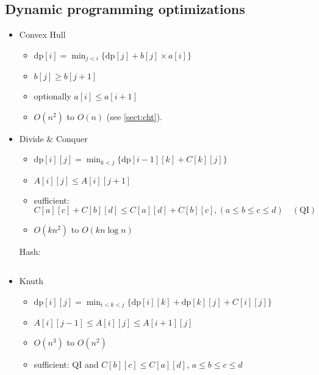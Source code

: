 \documentclass[9pt,a4paper,landscape,oneside]{amsart}
\newcommand{\mintedstyle}[2]{\inputminted{#1}{code/#2}}
\newcommand{\code}[1]{ Hash: 
\mintedstyle{cpp}{#1}}
\newenvironment{myitemize}
{\begin{itemize}[leftmargin=.3cm]
	\setlength{\itemsep}{0pt}
	\setlength{\parskip}{0pt}
	\setlength{\parsep}{0pt}     }
{ \end{itemize}                  }
\begin{document}
\begin{multicols*}{3}
\subsection{Dynamic programming optimizations}
\begin{myitemize}
	\item Convex Hull
		\begin{myitemize}
			\item $\mathrm{dp}[i] = \min_{j<i}\{\mathrm{dp}[j] + b[j] \times a[i]\}$
			\item $b[j] \geq b[j+1]$
			\item optionally $a[i] \leq a[i+1]$
			\item $O(n^2)$ to $O(n)$ (see \ref{sect:cht}).
		\end{myitemize}
	\item Divide \& Conquer
		\begin{myitemize}
			\item $\mathrm{dp}[i][j] = \min_{k<j}\{\mathrm{dp}[i-1][k] + C[k][j]\}$
			\item $A[i][j] \leq A[i][j+1]$
			\item sufficient:
				\[ C[a][c] + C[b][d] \leq C[a][d] + C[b][c], (a\leq b\leq c\leq d) \quad (\text{QI}) \]
			\item $O(kn^2)$ to $O(kn\log{n})$
		\end{myitemize}
		\code{divco.cpp}
	\item Knuth
		\begin{myitemize}
			\item $\mathrm{dp}[i][j] = \min_{i<k<j}\{\mathrm{dp}[i][k] + \mathrm{dp}[k][j] + C[i][j]\}$
			\item $A[i][j-1] \leq A[i][j] \leq A[i+1][j]$
			\item $O(n^3)$ to $O(n^2)$
			\item sufficient: QI and $C[b][c] \leq C[a][d]$, $a\leq b\leq c\leq d$
		\end{myitemize}
\end{myitemize}


\end{multicols*}
\end{document}
